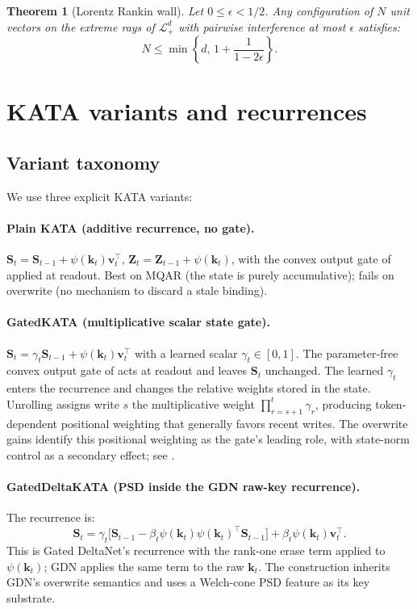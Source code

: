 \documentclass{article}
\newcommand{\1}{\bm{1}}
\def\eps{{\epsilon}}
\def\vk{{\bm{k}}}
\def\vv{{\bm{v}}}
\def\mS{{\bm{S}}}
\def\mZ{{\bm{Z}}}
\def\gL{{\mathcal{L}}}
\newtheorem{theorem}{Theorem}
\theoremstyle{definition}
\begin{document}
\begin{theorem}[Lorentz Rankin wall]
  \label{thm:cap-lor}
  Let $0\le\eps<1/2$. Any configuration of $N$ unit vectors on the extreme rays of
  $\gL^d_{+}$ with pairwise interference at most $\eps$ satisfies:
  \[
    N\le \min\!\left\{d,\,1+\frac{1}{1-2\eps}\right\}.
  \]
\end{theorem}



\section{KATA variants and recurrences}
\label{app:variants}

\subsection{Variant taxonomy}

We use three explicit KATA variants:

\paragraph{Plain KATA (additive recurrence, no gate).}
$\mS_t = \mS_{t-1} + \psi(\vk_t)\vv_t^\top$,\;
$\mZ_t = \mZ_{t-1} + \psi(\vk_t)$, with the convex output gate of 
applied at readout. Best on MQAR (the state is purely accumulative); fails on overwrite (no
mechanism to discard a stale binding).

\paragraph{GatedKATA (multiplicative scalar state gate).}
$\mS_t = \gamma_t\mS_{t-1} + \psi(\vk_t)\vv_t^\top$ with a learned scalar
$\gamma_t\in[0,1]$. The parameter-free convex output gate of  acts at
readout and leaves $\mS_t$ unchanged. The learned $\gamma_t$ enters the recurrence and changes
the relative weights stored in the state. Unrolling assigns write $s$ the multiplicative weight
$\prod_{r=s+1}^{t}\gamma_r$, producing token-dependent positional weighting that generally favors
recent writes. The overwrite gains identify this positional weighting as the gate's leading role,
with state-norm control as a secondary effect; see .

\paragraph{GatedDeltaKATA (PSD inside the GDN raw-key recurrence).}
The recurrence is:
\[
  \mS_t
  =\gamma_t\bigl[\mS_{t-1}-\beta_t\psi(\vk_t)\psi(\vk_t)^\top\mS_{t-1}\bigr]
   +\beta_t\psi(\vk_t)\vv_t^\top.
\]
This is Gated DeltaNet's recurrence with the rank-one erase
term applied to $\psi(\vk_t)$; GDN applies the same term to the raw $\vk_t$. The construction
inherits GDN's overwrite semantics and uses a Welch-cone PSD feature as its key substrate.
\end{document}
